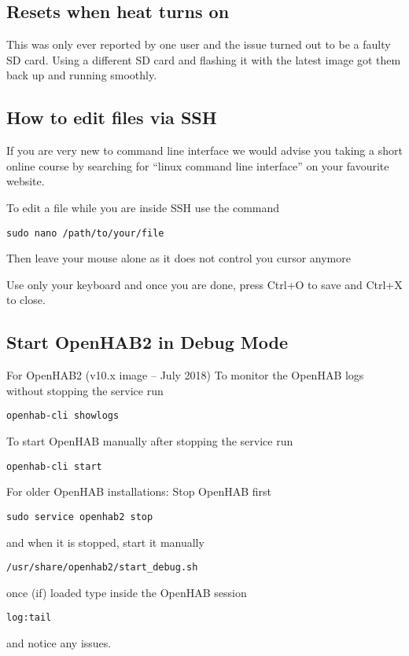 \subsection{Resets when heat turns on}
This was only ever reported by one user and the issue turned out to be a faulty
SD card. Using a different SD card and flashing it with the latest image got
them back up and running smoothly.

\subsection{How to edit files via SSH}
If you are very new to command line interface we would advise you taking a
short online course by searching for ``linux command line interface'' on your
favourite website.

To edit a file while you are inside SSH use the command

\texttt{sudo nano /path/to/your/file}

Then leave your mouse alone as it does not control you cursor anymore

Use only your keyboard and once you are done, press Ctrl+O to save and Ctrl+X to close.

\subsection{Start OpenHAB2 in Debug Mode}

For OpenHAB2 (v10.x image -- July 2018)
To monitor the OpenHAB logs without stopping the service run

\texttt{openhab-cli showlogs}

To start OpenHAB manually after stopping the service run

\texttt{openhab-cli start}

For older OpenHAB installations:
Stop OpenHAB first

\texttt{sudo service openhab2 stop}

and when it is stopped, start it manually

\texttt{/usr/share/openhab2/start\_debug.sh}

once (if) loaded type inside the OpenHAB session

\texttt{log:tail}

and notice any issues.
